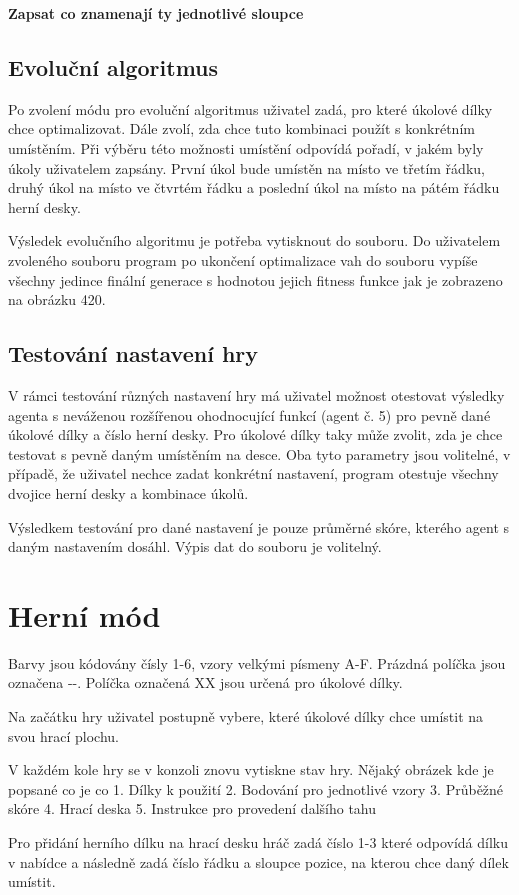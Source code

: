 \textbf{Zapsat co znamenají ty jednotlivé sloupce}


\subsection{Evoluční algoritmus}

Po zvolení módu pro evoluční algoritmus uživatel zadá, pro které úkolové dílky chce optimalizovat. Dále zvolí, zda chce tuto kombinaci použít s konkrétním umístěním. Při výběru této možnosti umístění odpovídá pořadí, v jakém byly úkoly uživatelem zapsány. První úkol bude umístěn na místo ve třetím řádku, druhý úkol na místo ve čtvrtém řádku a poslední úkol na místo na pátém řádku herní desky.

Výsledek evolučního algoritmu je potřeba vytisknout do souboru. Do uživatelem zvoleného souboru program po ukončení optimalizace vah do souboru vypíše všechny jedince finální generace s hodnotou jejich fitness funkce jak je zobrazeno na obrázku 420.

\subsection{Testování nastavení hry}

V rámci testování různých nastavení hry má uživatel možnost otestovat výsledky agenta s neváženou rozšířenou ohodnocující funkcí (agent č. 5) pro pevně dané úkolové dílky a číslo herní desky. Pro úkolové dílky taky může zvolit, zda je chce testovat s pevně daným umístěním na desce. Oba tyto parametry jsou volitelné, v případě, že uživatel nechce zadat konkrétní nastavení, program otestuje všechny dvojice herní desky a kombinace úkolů.

Výsledkem testování pro dané nastavení je pouze průměrné skóre, kterého agent s daným nastavením dosáhl. Výpis dat do souboru je volitelný.

\section{Herní mód}

Barvy jsou kódovány čísly 1-6, vzory velkými písmeny A-F.
Prázdná políčka jsou označena -{}-.
Políčka označená XX jsou určená pro úkolové dílky.

Na začátku hry uživatel postupně vybere, které úkolové dílky chce umístit na svou hrací plochu. 

\figureUkoly

V každém kole hry se v konzoli znovu vytiskne stav hry. Nějaký obrázek kde je popsané co je co
1. Dílky k použití
2. Bodování pro jednotlivé vzory
3. Průběžné skóre
4. Hrací deska
5. Instrukce pro provedení dalšího tahu

Pro přidání herního dílku na hrací desku hráč zadá číslo 1-3 které odpovídá dílku v nabídce a následně zadá číslo řádku a sloupce pozice, na kterou chce daný dílek umístit.

\figureSinglePlay